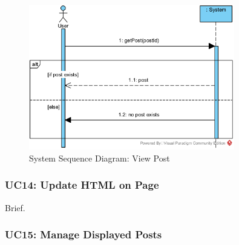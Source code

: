 \documentclass{article}
\begin{document}
\begin{figure}[H]
    \centering
    \includegraphics[width=0.8\textwidth]{images/SSD-UC13-ViewPost.png}
    \centering
    \caption{System Sequence Diagram: View Post}
\end{figure}
\subsubsection{UC14: Update HTML on Page}
Brief.
\subsubsection{UC15: Manage Displayed Posts}
\end{document}
